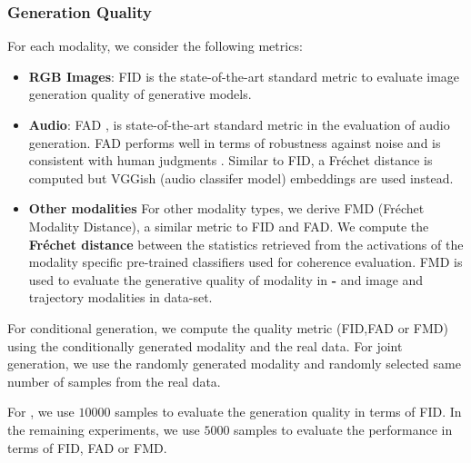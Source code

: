 \subsubsection{Generation Quality}
For each modality, we consider the following metrics: 
\begin{itemize}
    \item \textbf{RGB Images}: \gls{FID} \cite{fid} is the  state-of-the-art standard metric to evaluate image generation quality of generative models.
    \item \textbf{Audio}: \gls{FAD} \cite{fad},  is state-of-the-art standard metric in the evaluation of audio generation. \gls{FAD} performs well in terms of robustness against noise and is consistent with human judgments \cite{audiomet}. Similar to \gls{FID}, a Fréchet distance is computed but VGGish (audio classifer model) embeddings are used instead.
    \item \textbf{Other modalities} For other modality types, we derive \gls{FMD} (Fréchet Modality Distance), a similar metric to  \gls{FID} and \gls{FAD}. We compute the \textbf{Fréchet distance} between the statistics retrieved from the activations of the modality specific pre-trained classifiers used for coherence evaluation. \gls{FMD} is used to evaluate the generative quality of \mnist modality in \textbf{\mnist-\svhn} and image and trajectory modalities in \textbf{\mhd} data-set.
\end{itemize}
For conditional generation, we compute the quality metric (\gls{FID},\gls{FAD} or \gls{FMD}) using the conditionally generated modality and the real data. For joint generation, we use the randomly generated modality and randomly selected same number of samples from the real data.

 For \textbf{\cub}, we use $10000$ samples to evaluate the generation quality in terms of \gls{FID}.
In the remaining experiments, we use $5000$ samples to evaluate the performance in terms of \gls{FID}, \gls{FAD} or \gls{FMD}.




